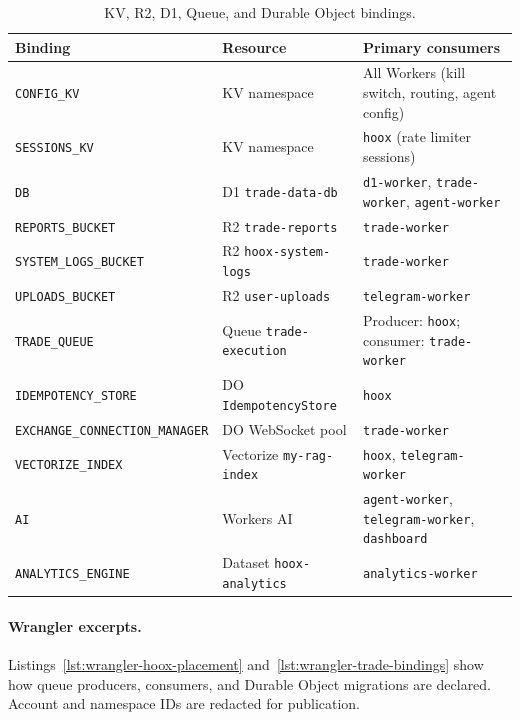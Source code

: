 \begin{table}[h]
  \centering
  \caption{KV, R2, D1, Queue, and Durable Object bindings.}
  \label{tab:storage-bindings}
  \small
  \begin{tabular*}{\linewidth}{@{\extracolsep{\fill}}llp{5.5cm}@{}}
    \toprule
    \textbf{Binding} & \textbf{Resource} & \textbf{Primary consumers} \\
    \midrule
    \texttt{CONFIG\_KV} & KV namespace & All Workers (kill switch, routing, agent config) \\
    \texttt{SESSIONS\_KV} & KV namespace & \texttt{hoox} (rate limiter sessions) \\
    \texttt{DB} & D1 \texttt{trade-data-db} & \texttt{d1-worker}, \texttt{trade-worker}, \texttt{agent-worker} \\
    \texttt{REPORTS\_BUCKET} & R2 \texttt{trade-reports} & \texttt{trade-worker} \\
    \texttt{SYSTEM\_LOGS\_BUCKET} & R2 \texttt{hoox-system-logs} & \texttt{trade-worker} \\
    \texttt{UPLOADS\_BUCKET} & R2 \texttt{user-uploads} & \texttt{telegram-worker} \\
    \texttt{TRADE\_QUEUE} & Queue \texttt{trade-execution} & Producer: \texttt{hoox}; consumer: \texttt{trade-worker} \\
    \texttt{IDEMPOTENCY\_STORE} & DO \texttt{IdempotencyStore} & \texttt{hoox} \\
    \texttt{EXCHANGE\_CONNECTION\_MANAGER} & DO WebSocket pool & \texttt{trade-worker} \\
    \texttt{VECTORIZE\_INDEX} & Vectorize \texttt{my-rag-index} & \texttt{hoox}, \texttt{telegram-worker} \\
    \texttt{AI} & Workers AI & \texttt{agent-worker}, \texttt{telegram-worker}, \texttt{dashboard} \\
    \texttt{ANALYTICS\_ENGINE} & Dataset \texttt{hoox-analytics} & \texttt{analytics-worker} \\
    \bottomrule
  \end{tabular*}
\end{table}

\paragraph{Wrangler excerpts.} Listings~\ref{lst:wrangler-hoox-placement} and~\ref{lst:wrangler-trade-bindings} show how queue producers, consumers, and Durable Object migrations are declared. Account and namespace IDs are redacted for publication.

